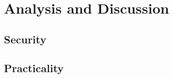 \section{Analysis and Discussion} \label{sect:analysis}


\subsection{Security}


\subsection{Practicality}